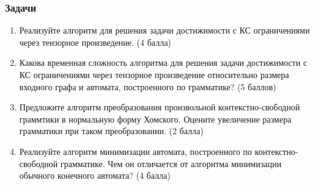 \documentclass[xcolor=table]{beamer}
\begin{document}
\begin{frame} \frametitle{Задачи}

\begin{enumerate}
\item Реализуйте алгоритм для решения задачи достижимости с КС ограничениями через тензорное произведение. (4 балла)
\item Какова временная сложность алгоритма для решения задачи достижимости с КС ограничениями через тензорное произведение относительно размера входного графа и автомата, построенного по грамматике? (5 баллов)
\item Предложите алгоритм преобразования произвольной контекстно-свободной граммтики в нормальную форму Хомского. Оцените увеличение размера грамматики при таком преобразовании. (2 балла)
\item Реализуйте алгоритм минимизации автомата, построенного по контекстно-свободной грамматике. Чем он отличается от алгоритма минимизации обычного конечного автомата? (4 балла)
\end{enumerate}

\end{frame}
\end{document}
